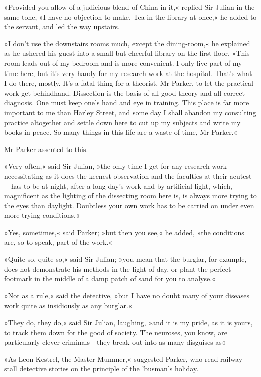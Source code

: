 »Provided you allow of a judicious blend of China in it,« replied Sir Julian in the same tone, »I have no objection to make. Tea in the library at once,« he added to the servant, and led the way upstairs.

»I don't use the downstairs rooms much, except the dining-room,« he explained as he ushered his guest into a small but cheerful library on the first floor. »This room leads out of my bedroom and is more convenient. I only live part of my time here, but it's very handy for my research work at the hospital. That's what I do there, mostly. It's a fatal thing for a theorist, Mr Parker, to let the practical work get behindhand. Dissection is the basis of all good theory and all correct diagnosis. One must keep one's hand and eye in training. This place is far more important to me than Harley Street, and some day I shall abandon my consulting practice altogether and settle down here to cut up my subjects and write my books in peace. So many things in this life are a waste of time, Mr Parker.«

Mr Parker assented to this.

»Very often,« said Sir Julian, »the only time I get for any research work—necessitating as it does the keenest observation and the faculties at their acutest—has to be at night, after a long day's work and by artificial light, which, magnificent as the lighting of the dissecting room here is, is always more trying to the eyes than daylight. Doubtless your own work has to be carried on under even more trying conditions.«

»Yes, sometimes,« said Parker; »but then you see,« he added, »the conditions are, so to speak, part of the work.«

»Quite so, quite so,« said Sir Julian; »you mean that the burglar, for example, does not demonstrate his methods in the light of day, or plant the perfect footmark in the middle of a damp patch of sand for you to analyse.«

»Not as a rule,« said the detective, »but I have no doubt many of your diseases work quite as insidiously as any burglar.«

»They do, they do,« said Sir Julian, laughing, »and it is my pride, as it is yours, to track them down for the good of society. The neuroses, you know, are particularly clever criminals—they break out into as many disguises as\longdash«

»As Leon Kestrel, the Master-Mummer,« suggested Parker, who read railway-stall detective stories on the principle of the 'busman's holiday.

